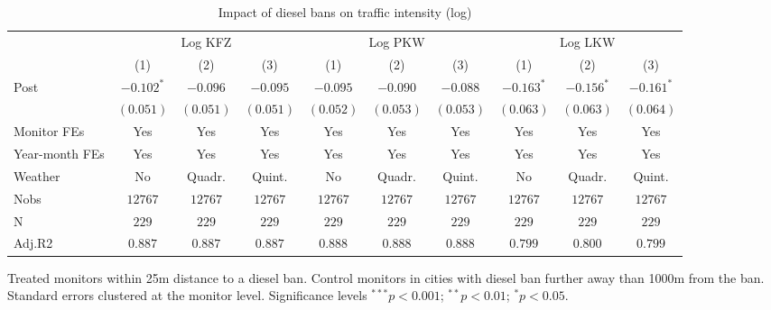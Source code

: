 
\begin{table}[h]
\caption{Impact of diesel bans on traffic intensity (log)}
\begin{center}
\begin{footnotesize}
\begin{threeparttable}
\begin{tabular}{l c c c c c c c c c}
\toprule
& \multicolumn{3}{c}{Log KFZ } & \multicolumn{3}{c}{Log PKW }  & \multicolumn{3}{c}{Log LKW } \\ \cmidrule(r){2-4} \cmidrule(r){5-7} \cmidrule(r){8-10}
 & (1) & (2) & (3) & (1) & (2) & (3) & (1) & (2) & (3) \\
\midrule
Post   & $-0.102^{*}$ & $-0.096$  & $-0.095$  & $-0.095$  & $-0.090$  & $-0.088$  & $-0.163^{*}$ & $-0.156^{*}$ & $-0.161^{*}$ \\
       & $(0.051)$    & $(0.051)$ & $(0.051)$ & $(0.052)$ & $(0.053)$ & $(0.053)$ & $(0.063)$    & $(0.063)$    & $(0.064)$    \\
\midrule
Monitor FEs   & Yes & Yes & Yes  & Yes & Yes & Yes & Yes & Yes & Yes    \\
Year-month FEs     & Yes & Yes & Yes  & Yes & Yes & Yes & Yes & Yes & Yes  \\
Weather     & No & Quadr. & Quint.  & No & Quadr. & Quint. & No & Quadr. & Quint.   \\ \midrule
Nobs   & $12767$      & $12767$   & $12767$   & $12767$   & $12767$   & $12767$   & $12767$      & $12767$      & $12767$      \\
N      & $229$        & $229$     & $229$     & $229$     & $229$     & $229$     & $229$        & $229$        & $229$        \\
Adj.R2 & $0.887$      & $0.887$   & $0.887$   & $0.888$   & $0.888$   & $0.888$   & $0.799$      & $0.800$      & $0.799$      \\
\bottomrule
\end{tabular}
\begin{tablenotes}[flushleft]
\tiny{\item Treated monitors within 25m distance to a diesel ban. 
       Control monitors in cities with diesel ban further away than 1000m from the ban. 
       Standard errors clustered at the monitor level.
       Significance levels $^{***}p<0.001$; $^{**}p<0.01$; $^{*}p<0.05$.}
\end{tablenotes}
\end{threeparttable}
\end{footnotesize}
\label{table:coefficients}
\end{center}
\end{table}
